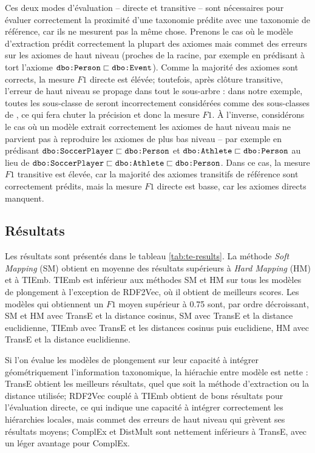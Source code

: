 Ces deux modes d'évaluation – directe et transitive – sont nécessaires pour évaluer correctement la proximité d'une taxonomie prédite avec une taxonomie de référence, car ils ne mesurent pas la même chose. Prenons le cas où le modèle d'extraction prédit correctement la plupart des axiomes mais commet des erreurs sur les axiomes de haut niveau (proches de la racine, par exemple en prédisant à tort l'axiome $\texttt{dbo:Person} \sqsubset \texttt{dbo:Event}$). Comme la majorité des axiomes sont corrects, la mesure $F1$ directe est élévée; toutefois, après clôture transitive, l'erreur de haut niveau se propage dans tout le sous-arbre : dans notre exemple, toutes les sous-classe de  seront incorrectement considérées comme des sous-classes de , ce qui fera chuter la précision et donc la mesure $F1$. À l'inverse, considérons le cas où un modèle extrait correctement les axiomes de haut niveau mais ne parvient pas à reproduire les axiomes de plus bas niveau – par exemple en prédisant $\texttt{dbo:SoccerPlayer} \sqsubset \texttt{dbo:Person}$ et $\texttt{dbo:Athlete} \sqsubset \texttt{dbo:Person}$ au lieu de $\texttt{dbo:SoccerPlayer} \sqsubset \texttt{dbo:Athlete} \sqsubset \texttt{dbo:Person}$. Dans ce cas, la mesure $F1$ transitive est élevée, car la majorité des axiomes transitifs de référence sont correctement prédits, mais la mesure $F1$ directe est basse, car les axiomes directs manquent. %


\subsection{Résultats}
\label{subsec:te-results}

Les résultats sont présentés dans le tableau \ref{tab:te-results}. La méthode \textit{Soft Mapping} (SM) obtient en moyenne des résultats supérieurs à \textit{Hard Mapping} (HM) et à TIEmb. TIEmb est inférieur aux méthodes SM et HM sur tous les modèles de plongement à l'exception de RDF2Vec, où il obtient de meilleurs scores. Les modèles qui obtiennent un $F1$ moyen supérieur à 0.75 sont, par ordre décroissant, SM et HM avec TransE et la distance cosinus, SM avec TransE et la distance euclidienne, TIEmb avec TransE et les distances cosinus puis euclidiene, HM avec TransE et la distance euclidienne. 

Si l'on évalue les modèles de plongement sur leur capacité à intégrer géométriquement l'information taxonomique, la hiérachie entre modèle est nette : TransE obtient les meilleurs résultats, quel que soit la méthode d'extraction ou la distance utilisée; RDF2Vec couplé à TIEmb obtient de bons résultats pour l'évaluation directe, ce qui indique une capacité à intégrer correctement les hiérarchies locales, mais commet des erreurs de haut niveau qui grèvent ses résultats moyens; ComplEx et DistMult sont nettement inférieurs à TransE, avec un léger avantage pour ComplEx.

